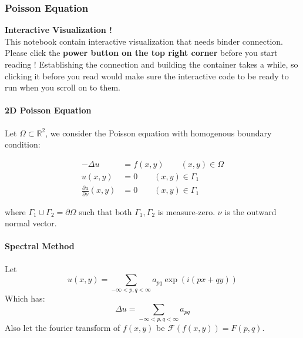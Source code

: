 \subsubsection{Poisson Equation}

\begin{framed}
\textbf{Interactive Visualization !}\\
This notebook contain interactive visualization that needs binder connection. Please click the \textbf{power button on the top right corner} before you start reading ! Establishing the connection and building the container takes a while, so clicking it before you read would make sure the interactive code to be ready to run when you scroll on to them.
\end{framed}

\paragraph{2D Poisson Equation}

Let $\Omega \subset \mathbb{R}^2$, we consider the Poisson equation with homogenous boundary condition:

\begin{definition}\begin{equation}
\label{2dpoihb}
\begin{aligned}
-\Delta u &= f(x,y) \qquad (x,y)\in \Omega \\
  u(x,y) &= 0 \qquad (x,y)\in \Gamma_1 \\
  \frac{\partial u}{\partial \nu}(x,y) &= 0 \qquad (x,y)\in \Gamma_1
\end{aligned}
\end{equation}

\end{definition}where $\Gamma_1\cup \Gamma_2 = \partial \Omega$ such that both $\Gamma_1, \Gamma_2$ is measure-zero. $\nu$ is the outward normal vector.

\paragraph{Spectral Method}

Let
\begin{equation}
u(x,y)=\sum_{-\infty<p,q<\infty} a_{pq}  \exp(i(px +qy))
\end{equation}
Which has:
\begin{equation}
\Delta u = \sum_{-\infty<p,q<\infty} a_{pq}
\end{equation}
Also let the fourier transform of $f(x,y)$ be $\mathcal F (f(x,y))=F(p,q)$.

